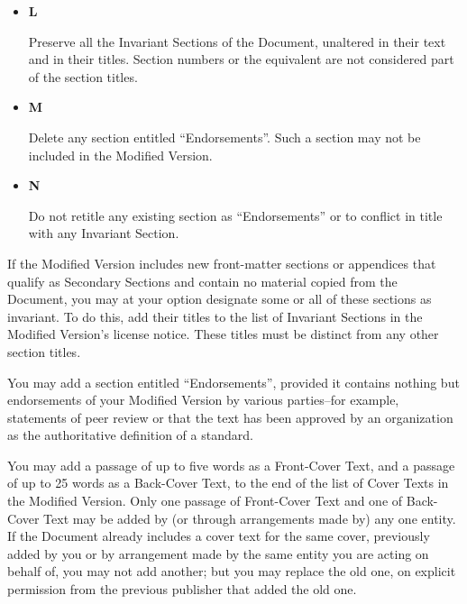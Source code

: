 \begin{itemize}
 
\item \textbf{L}
	  

	    Preserve all the Invariant
	    Sections of the Document, unaltered in their
	    text and in their titles.  Section numbers or the
	    equivalent are not considered part of the section titles.
	  

 
\item \textbf{M}
	  

	    Delete any section entitled
	    ``Endorsements''. Such a section may not be
	    included in the Modified
	    Version.
	  

 
\item \textbf{N}
	  

	    Do not retitle any existing section as
	    ``Endorsements'' or to conflict in title with
	    any Invariant
	    Section.
	  

 
\end{itemize}
    
    

      If the Modified Version
      includes new front-matter sections or appendices that qualify as
      Secondary Sections and
      contain no material copied from the Document, you may at your
      option designate some or all of these sections as invariant. To
      do this, add their titles to the list of Invariant Sections in the
      Modified Version's license notice.  These titles must be
      distinct from any other section titles.
    

    
    

      You may add a section entitled ``Endorsements'',
      provided it contains nothing but endorsements of your Modified Version by various
      parties--for example, statements of peer review or that the text
      has been approved by an organization as the authoritative
      definition of a standard.
    

    
    

      You may add a passage of up to five words as a Front-Cover Text, and a passage
      of up to 25 words as a Back-Cover Text, to the end of
      the list of Cover Texts
      in the Modified Version.
      Only one passage of Front-Cover Text and one of Back-Cover Text
      may be added by (or through arrangements made by) any one
      entity. If the Document
      already includes a cover text for the same cover, previously
      added by you or by arrangement made by the same entity you are
      acting on behalf of, you may not add another; but you may
      replace the old one, on explicit permission from the previous
      publisher that added the old one.
    


